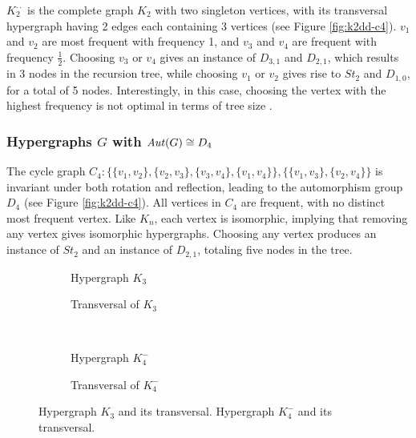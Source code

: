 $K_2^{\cdot\cdot}$ is the complete graph $K_2$ with two singleton vertices, with its transversal hypergraph having 2 edges each containing 3 vertices (see Figure \ref{fig:k2dd-c4}). $v_1$ and $v_2$ are most frequent with frequency 1, and $v_3$ and $v_4$ are frequent with frequency $\frac{1}{2}$. Choosing $v_3$ or $v_4$ gives an instance of $D_{3,1}$ and $D_{2,1}$, which results in 3 nodes in the recursion tree, while choosing $v_1$ or $v_2$ gives rise to $St_2$ and $D_{1,0}$, for a total of 5 nodes. Interestingly, in this case, choosing the vertex with the highest frequency is not optimal in terms of tree size .

\subsubsection*{Hypergraphs $G$ with $\mathit{Aut}(G)\cong D_4$}

The cycle graph $C_4:\{\{v_1,v_2\},\{v_2,v_3\},\{v_3,v_4\},\{v_1,v_4\}\},\{\{v_1,v_3\},\{v_2,v_4\}\}$  is invariant under both rotation and reflection, leading to the automorphism group $D_4$ (see Figure \ref{fig:k2dd-c4}). All vertices in $C_4$ are frequent, with no distinct most frequent vertex. Like $K_n$, each vertex is isomorphic, implying that removing any vertex gives isomorphic hypergraphs. Choosing any vertex produces an instance of $St_2$ and an instance of $D_{2,1}$, totaling five nodes in the tree.

\begin{figure}[tp]
\centering
\begin{subfigure}{0.45\linewidth}\centering\caption{Hypergraph $K_3$}\end{subfigure}\hfill
\begin{subfigure}{0.45\linewidth}\centering\caption{Transversal of $K_3$}\end{subfigure}\\[8pt]
\begin{subfigure}{0.45\linewidth}\centering\caption{Hypergraph $K_4^-$}\end{subfigure}\hfill
\begin{subfigure}{0.45\linewidth}\centering\caption{Transversal of $K_4^-$}\end{subfigure}
\caption{Hypergraph $K_3$ and its transversal. Hypergraph $K_4^-$ and its transversal.}\label{fig:k3-k4minus}
\end{figure}

